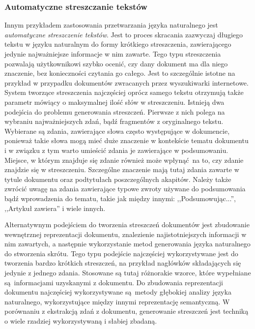 \documentclass[a4paper, twoside, 12pt]{report}
\begin{document}
            \subsubsection{Automatyczne streszczanie tekstów}
                Innym przykładem zastosowania przetwarzania języka naturalnego jest \emph{automatyczne streszczenie tekstów}.
                Jest to proces skracania zazwyczaj długiego tekstu w języku naturalnym do formy krótkiego streszczenia,
                zawierającego jedynie najważniejsze informacje w nim zawarte. Tego typu streszczenia pozwalają
                użytkownikowi szybko ocenić, czy dany dokument ma dla niego znaczenie, bez konieczności czytania go całego.
                Jest to szczególnie istotne na przykład w przypadku dokumentów zwracanych przez wyszukiwarki internetowe.
                System tworzące streszczenia najczęściej oprócz samego tekstu otrzymują także parametr
                mówiący o maksymalnej ilość słów w streszczeniu. Istnieją dwa podejścia do problemu generowania streszczeń.
                Pierwsze z nich polega na wybraniu najważniejszych zdań, bądź fragmentów z oryginalnego tekstu. Wybierane
                są zdania, zawierające słowa często występujące w dokumencie, ponieważ takie słowa mogą mieć duże znaczenie
                w kontekście tematu dokumentu i w związku z tym warto umieścić zdania je zawierające w podsumowaniu. Miejsce,
                w którym znajduje się zdanie również może wpłynąć na to, czy zdanie znajdzie się w streszczeniu. Szczególne
                znaczenie mają tutaj zdania zawarte w tytule dokumentu oraz podtytułach poszczególnych akapitów. Należy
                także zwrócić uwagę na zdania zawierające typowe zwroty używane do podsumowania bądź wprowadzenia do tematu,
                takie jak między innymi: ,,Podsumowując...'', ,,Artykuł zawiera'' i wiele innych.

                Alternatywnym podejściem do tworzenia streszczeń dokumentów jest zbudowanie wewnętrznej reprezentacji
                dokumentu, znalezienie najistotniejszych informacji w nim zawartych, a następnie wykorzystanie metod
                generowania języka naturalnego do stworzenia skrótu. Tego typu podejście najczęściej wykorzystywane jest
                do tworzenia bardzo krótkich streszczeń, na przykład nagłówków składających się jedynie z jednego zdania.
                Stosowane są tutaj różnorakie wzorce, które wypełniane są informacjami uzyskanymi z dokumentu. Do zbudowania
                reprezentacji dokumentu najczęściej wykorzystywane są metody głębokiej analizy języka naturalnego,
                wykorzystujące między innymi reprezentację semantyczną. W porównaniu z ekstrakcją zdań z dokumentu, generowanie
                streszczeń jest techniką o wiele rzadziej wykorzystywaną i słabiej zbadaną\cite{SUMMARIZATIONOVERVIEW}.
\end{document}
